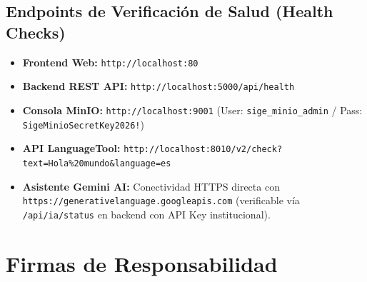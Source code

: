 \documentclass[12pt,a4paper]{article}
\begin{document}
\subsection{Endpoints de Verificación de Salud (Health Checks)}
\begin{itemize}[leftmargin=1.5em, itemsep=2pt]
    \item \textbf{Frontend Web:} \texttt{http://localhost:80}
    \item \textbf{Backend REST API:} \texttt{http://localhost:5000/api/health}
    \item \textbf{Consola MinIO:} \texttt{http://localhost:9001} (User: \texttt{sige\_minio\_admin} / Pass: \texttt{SigeMinioSecretKey2026!})
    \item \textbf{API LanguageTool:} \texttt{http://localhost:8010/v2/check?text=Hola\%20mundo\&language=es}
    \item \textbf{Asistente Gemini AI:} Conectividad HTTPS directa con \texttt{https://generativelanguage.googleapis.com} (verificable vía \texttt{/api/ia/status} en backend con API Key institucional).
\end{itemize}

\vspace{0.3cm}

\section{Firmas de Responsabilidad}
\end{document}
